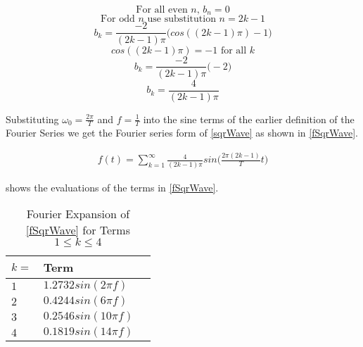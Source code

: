 \documentclass[main.tex]{subfile}
\begin{document}
	$$\text{For all even $n$, } b_n = 0$$
	$$\text{For odd $n$ use substitution $n = 2k-1$}$$
	$$b_k = \frac{-2}{(2k-1) \pi} \Big(cos((2k-1) \pi) - 1 \Big)$$
	$$cos((2k-1) \pi) = -1 \text{ for all $k$}$$
	$$b_k = \frac{-2}{(2k-1) \pi} \Big(-2 \Big)$$
	$$b_k = \frac{4}{(2k-1) \pi}$$
	
	Substituting $\omega_0 = \frac{2 \pi}{T}$ and $f = \frac{1}{T}$ into the sine
	terms of the earlier definition of the Fourier Series we get the Fourier
	series form of \eqref{sqrWave} as shown in \eqref{fSqrWave}.
	
	\begin{align}
	f(t) = \sum_{k=1}^{\infty} \frac{4}{(2k-1) \pi} sin\Big(\frac{2 \pi (2k-1)}{T}t \Big)
	\label{eq:fSqrWave}
	\end{align}

	 shows the evaluations of the terms in \eqref{fSqrWave}.

	\begin{table}[H]
	  \begin{center}
			\caption{Fourier Expansion of \eqref{fSqrWave} for Terms $1 \leq k \leq 4$}
			\label{tab:termExpansion}
	    \begin{tabular}{lll}
	      \\ \toprule
				$k =$ & Term
	      \\ \midrule
				$1$ & $1.2732 sin(2 \pi f)$
				\\$2$ &	$0.4244 sin(6 \pi f)$
				\\$3$	&	$0.2546 sin(10 \pi f)$
				\\$4$	&	$0.1819 sin(14 \pi f)$
	      \\ \bottomrule
	    \end{tabular}
	  \end{center}
	\end{table}
	
\end{document}
